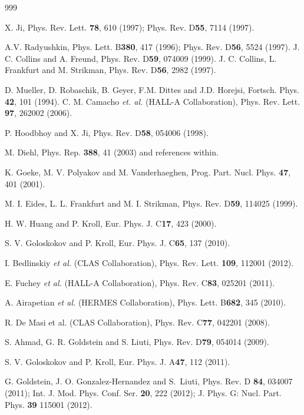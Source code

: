 \documentclass[prc,floatfix,twocolumn,superscriptaddress,letter]{revtex4}
\begin{document}
\twocolumngrid
\begin{thebibliography} {999}




 X. Ji, Phys. Rev. Lett. {\bf78}, 610 (1997); Phys. Rev. D{\bf 55}, 7114 (1997).

 A.V. Radyushkin, Phys. Lett. B{\bf380}, 417 (1996); Phys. Rev. D{\bf 56}, 5524 (1997).
 J. C. Collins and A. Freund, Phys. Rev. D{\bf59}, 074009 (1999).
 J. C. Collins, L. Frankfurt and M. Strikman, Phys. Rev. D{\bf56}, 2982 (1997).


 D. Mueller, D. Robaschik, B. Geyer, F.M. Dittes  and J.D. Horejsi,  Fortsch. Phys. {\bf 42}, 101 (1994).
 C. M. Camacho {\it et. al.}  (HALL-A Collaboration), Phys. Rev. Lett. {\bf97},  262002 (2006).

 P. Hoodbhoy and X.  Ji, Phys. Rev.  D{\bf58}, 054006 (1998).

 M. Diehl, Phys. Rep. {\bf 388}, 41 (2003) and references within.

 K. Goeke, M. V. Polyakov and  M. Vanderhaeghen, 
Prog. Part.  Nucl. Phys. {\bf47}, 401 (2001).

M. I. Eides, L. L. Frankfurt and M. I. Strikman, Phys. Rev. D{\bf 59}, 114025 (1999).

H. W. Huang and P. Kroll,  Eur. Phys. J. C{\bf17}, 423 (2000).

S. V. Goloskokov and P. Kroll, Eur. Phys. J. C{\bf65}, 137 (2010).

 
 I. Bedlinskiy {\it et al.} (CLAS Collaboration), Phys. Rev. Lett. {\bf 109}, 112001 (2012). 

E. Fuchey {\it et al.} (HALL-A Collaboration), Phys. Rev.  C{\bf83}, 025201 (2011).

 A. Airapetian {\it et al.} (HERMES Collaboration), Phys. Lett.  B{\bf682}, 345 (2010).

 R. De Masi et al. (CLAS Collaboration),  Phys. Rev. C{\bf77}, 042201 (2008). 

S. Ahmad, G. R. Goldstein and S. Liuti, Phys. Rev. D{\bf79}, 054014 (2009).

S. V. Goloskokov and P. Kroll, Eur. Phys. J. A{\bf47}, 112 (2011).

  G. Goldstein, J. O. Gonzalez-Hernandez  and S.~Liuti,
Phys. Rev. D {\bf84}, 034007 (2011);
Int. J. Mod. Phys. Conf. Ser. {\bf20}, 222 (2012);
J. Phys. G: Nucl. Part. Phys. {\bf39} 115001 (2012).



\end{thebibliography}
\end{document}
